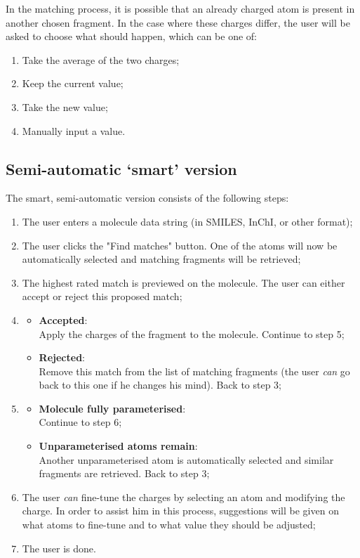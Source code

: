 \noindent
In the matching process, it is possible that an already charged atom is present in another chosen fragment. In the case where these charges differ, the user will be asked to choose what should happen, which can be one of:
\begin{enumerate}[itemsep=.1em, parsep=.2em, topsep=0em]
\item Take the average of the two charges;
\item Keep the current value;
\item Take the new value;
\item Manually input a value.
\end{enumerate}

\subsection{Semi-automatic `smart' version}
The smart, semi-automatic version consists of the following steps:
\begin{enumerate}[itemsep=.1em, parsep=.2em, topsep=0em]
\item The user enters a molecule data string (in SMILES, InChI, or other format);
\item The user clicks the "Find matches" button. One of the atoms will now be automatically selected and matching fragments will be retrieved;
\item The highest rated match is previewed on the molecule. The user can either accept or reject this proposed match;
\item
\begin{itemize}[leftmargin=0cm, itemsep=.1em, parsep=.1em]
\item[] {\bf Accepted}:\\Apply the charges of the fragment to the molecule. Continue to step 5;
\item[]{\bf Rejected}:\\Remove this match from the list of matching fragments (the user \emph{can} go back to this one if he changes his mind). Back to step 3;
\end{itemize}
\item
\begin{itemize}[leftmargin=0cm, itemsep=.1em, parsep=.1em]
\item[] {\bf Molecule fully parameterised}:\\Continue to step 6;
\item[]{\bf Unparameterised atoms remain}:\\Another unparameterised atom is automatically selected and similar fragments are retrieved. Back to step 3;
\end{itemize}
\item The user \emph{can} fine-tune the charges by selecting an atom and modifying the charge. In order to assist him in this process, suggestions will be given on what atoms to fine-tune and to what value they should be adjusted;
\item The user is done.
\end{enumerate}

